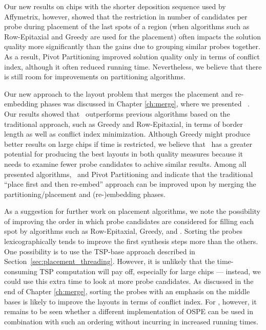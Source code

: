 Our new results on chips with the shorter deposition sequence used by
Affymetrix, however, showed that the restriction in number of candidates per
probe during placement of the last spots of a region (when algorithms such as
Row-Epitaxial and Greedy are used for the placement) often impacts the solution
quality more significantly than the gains due to grouping similar probes
together. As a result, Pivot Partitioning improved solution quality only in
terms of conflict index, although it often reduced running time. Nevertheless,
we believe that there is still room for improvements on partitioning algorithms.

Our new approach to the layout problem that merges the placement and
re-embedding phases was discussed in Chapter \ref{ch:merge}, where we presented
\Greedyplus\ \citep{Carvalho2007}. Our results showed that \Greedyplus\
outperforms previous algorithms based on the traditional approach, such as
Greedy and Row-Epitaxial, in terms of border length as well as conflict index
minimization. Although Greedy might produce better results on large chips if
time is restricted, we believe that \Greedyplus\ has a greater potential for
producing the best layouts in both quality measures because it needs to examine
fewer probe candidates to achive similar results. Among all presented
algorithms, \Greedyplus\ and Pivot Partitioning and indicate that the
traditional ``place first and then re-embed'' approach can be improved upon by
merging the partitioning/placement and (re-)embedding phases.

As a suggestion for further work on placement algorithms, we note the
possibility of improving the order in which probe candidates are considered for
filling each spot by algorithms such as Row-Epitaxial, Greedy, and \Greedyplus.
Sorting the probes lexicographically tends to improve the first synthesis steps
more than the others. One possibility is to use the TSP-base approach described
in Section~\ref{sec:placement_threading}. However, it is unlikely that the
time-consuming TSP computation will pay off, especially for large chips ---
instead, we could use this extra time to look at more probe candidates. As
discussed in the end of Chapter \ref{ch:merge}, sorting the probes with an
emphasis on the middle bases is likely to improve the layouts in terms of
conflict index. For \Greedyplus, however, it remains to be seen whether a
different implementation of OSPE can be used in combination with such an
ordering without incurring in increased running times.

